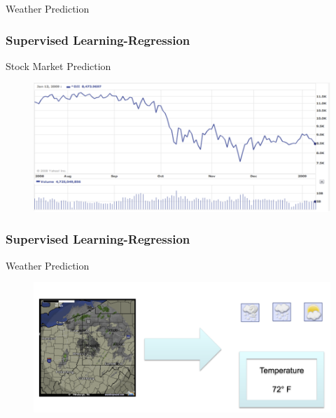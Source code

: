 \documentclass[9pt]{beamer}
\begin{document}
\begin{CJK*}{GBK}{kai}
\begin{frame}
\begin{block}{Weather Prediction}
\begin{figure}[h]
		\end{figure}
	\end{block}
\end{frame}

\begin{frame}
	\frametitle{Supervised Learning-Regression}
	\begin{block}{Stock Market Prediction}
		\begin{figure}[h]
			\centering
			\includegraphics[scale=0.3]{StockMarket.png}
			
		\end{figure}
	\end{block}
\end{frame}
\begin{frame}
	\frametitle{Supervised Learning-Regression}
	\begin{block}{Weather Prediction}
		\begin{figure}[h]
			\centering
			\includegraphics[scale=0.3]{WeatherRegression.png}
			

\end{figure}
\end{block}
\end{frame}
\end{CJK*}
\end{document}
